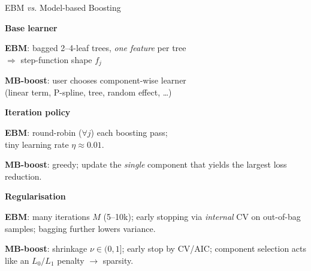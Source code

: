 \documentclass[10pt,compress,t,notes=noshow, xcolor=table]{beamer}
\begin{document}
\begin{framei}[align=top]{EBM \textit{vs.} Model-based Boosting}
\item \textbf{Base learner}
\begin{itemizeS}
\item \textbf{EBM}: bagged 2--4-leaf trees, \emph{one feature} per tree\\
$\Rightarrow$ step-function shape $f_j$  %
\item \textbf{MB-boost}: user chooses component-wise learner\\
(linear term, P-spline, tree, random effect, \dots)
\end{itemizeS}
\pause
\item \textbf{Iteration policy}
\begin{itemizeS}
\item \textbf{EBM}: round-robin ($\forall j$) each boosting pass; \\
tiny learning rate $\eta \approx 0.01$.
\item \textbf{MB-boost}: greedy; update the \emph{single} component that yields the largest loss reduction.
\end{itemizeS}
\pause
\item \textbf{Regularisation}
\begin{itemizeS}
\item \textbf{EBM}: many iterations $M$ (5--10k); early stopping via \emph{internal} CV on out-of-bag samples; bagging further lowers variance.
\item \textbf{MB-boost}: shrinkage $\nu \in (0,1]$; early stop by CV/AIC; component selection acts like an $L_0/L_1$ penalty $\rightarrow$ sparsity.
\end{itemizeS}
\end{framei}
\end{document}
